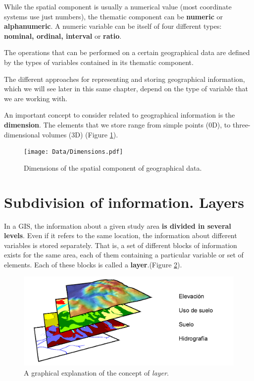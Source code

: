 While the spatial component is usually a numerical value (most coordinate systems use just numbers), the thematic component can be \textbf{numeric} or \textbf{alphanumeric}. A numeric variable can be itself of four different types: \textbf{nominal, ordinal, interval} or \textbf{ratio}.

The operations that can be performed on a certain geographical data are defined by the types of variables contained in its thematic component.

The different approaches for representing and storing geographical information, which we will see later in this same chapter, depend on the type of variable that we are working with.

An important concept to consider related to geographical information is the \textbf{dimension}. The elements that we store range from simple points (0D), to three-dimensional volumes (3D) (Figure \ref{Fig:Dimensions}).

\begin{figure}[!hbt] 
\centering
\texttt{[image: Data/Dimensions.pdf]}
\caption{\small Dimensions of the spatial component of geographical data.}
\label{Fig:Dimensions} 
\end{figure}


\section{Subdivision of information. Layers}

In a GIS, the information about a given study area \textbf{is divided in several levels}. Even if it refers to the same location, the information about different variables is stored separately. That is, a set of different blocks of information exists for the same area, each of them containing a particular variable or set of elements. Each of these blocks is called a \textbf{layer}.(Figure \ref{Fig:Concept_layer}). 

\begin{figure}[!hbt] 
\centering
\includegraphics[width=\textwidth]{Data/Concept_layer.png}
\caption{\small A graphical explanation of the concept of \emph{layer}.}
\label{Fig:Concept_layer} 
\end{figure}


